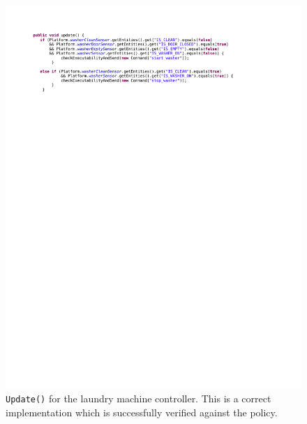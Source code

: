 \documentclass{article}
\begin{document}
\begin{figure}[h]
\begin{center}
\includegraphics[scale=0.7, trim = 0 21.5cm 0 2cm]{code.pdf}
\caption{\texttt{Update()} for the laundry machine controller. This is a correct implementation which is successfully verified against the policy.}
\label{fig:code}
\end{center}
\end{figure}
\end{document}
